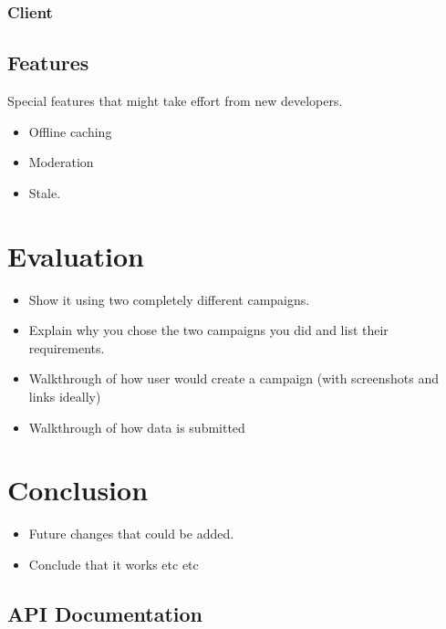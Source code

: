 \documentclass{article}
\let\oldsection\section
\renewcommand\section{\clearpage\oldsection}
\begin{document}
	\subsubsection{Client}

	\subsection{Features}

	Special features that might take effort from new developers.
	\begin{itemize}
		\item Offline caching
		\item Moderation
		\item Stale.
	\end{itemize}

	\section{Evaluation}
	\label{sec:evaluation}
		\begin{itemize}
			\item Show it using two completely different campaigns.
			\item Explain why you chose the two campaigns you did and list their requirements.
			\item Walkthrough of how user would create a campaign (with screenshots and links ideally)
			\item Walkthrough of how data is submitted
		\end{itemize}

	\section{Conclusion}
	\label{sec:conclusion}
		\begin{itemize}
			\item Future changes that could be added.
			\item Conclude that it works etc etc
		\end{itemize}

	
	

	\clearpage
	\begin{appendices}
	\oldsection{API Documentation}
	\label{sec:api-docs}
	\end{appendices}
\end{document}
